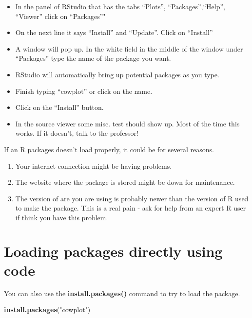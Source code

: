 \documentclass[]{book}
\newenvironment{Shaded}{\begin{snugshade}}{\end{snugshade}}
\newcommand{\KeywordTok}[1]{\textcolor[rgb]{0.13,0.29,0.53}{\textbf{#1}}}
\newcommand{\StringTok}[1]{\textcolor[rgb]{0.31,0.60,0.02}{#1}}
\newcommand{\NormalTok}[1]{#1}
\providecommand{\tightlist}{%
  \setlength{\itemsep}{0pt}\setlength{\parskip}{0pt}}
\theoremstyle{definition}
\theoremstyle{definition}
\theoremstyle{definition}
\theoremstyle{remark}
\begin{document}
\begin{itemize}
\tightlist
\item
  In the panel of RStudio that has the tabs ``Plots'',
  ``Packages'',``Help'', ``Viewer'' click on ``Packages''"
\item
  On the next line it says ``Install'' and ``Update''. Click on
  ``Install''
\item
  A window will pop up. In the white field in the middle of the window
  under ``Packages'' type the name of the package you want.
\item
  RStudio will automatically bring up potential packages as you type.
\item
  Finish typing ``cowplot'' or click on the name.
\item
  Click on the ``Install'' button.
\item
  In the source viewer some misc. test should show up. Most of the time
  this works. If it doesn't, talk to the professor!
\end{itemize}

If an R packages doesn't load properly, it could be for several reasons.

\begin{enumerate}
\def\labelenumi{\arabic{enumi}.}
\tightlist
\item
  Your internet connection might be having problems.\\
\item
  The website where the package is stored might be down for
  maintenance.\\
\item
  The version of are you are using is probably newer than the version of
  R used to make the package. This is a real pain - ask for help from an
  expert R user if think you have this problem.
\end{enumerate}

\section{Loading packages directly using
code}\label{loading-packages-directly-using-code}

You can also use the \textbf{install.packages()} command to try to load
the package.

\begin{Shaded}
\begin{Highlighting}[]
\KeywordTok{install.packages}\NormalTok{(}\StringTok{"cowplot"}\NormalTok{)}
\end{Highlighting}
\end{Shaded}
\end{document}
